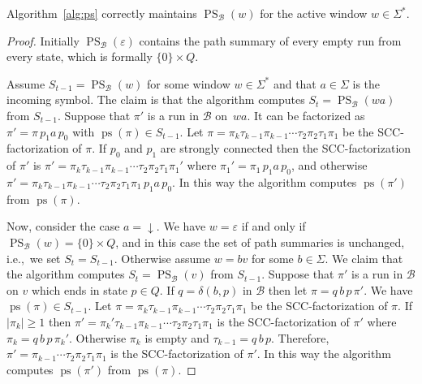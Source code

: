 \documentclass{article}\usepackage[a4paper,margin=20mm]{geometry}
\newcommand{\B}{\mathcal{B}}
\DeclareMathOperator{\ps}{ps}
\DeclareMathOperator{\PS}{PS}
\newcommand{\eps}{\varepsilon}
\renewcommand{\geq}{\geqslant}
\renewcommand{\ge}{\geq}
\begin{document}
\begin{lemma}
\label{lem:ps}
	Algorithm~\ref{alg:ps} correctly maintains $\PS_\B(w)$ for the active window $w \in \Sigma^*$.
\end{lemma}

\begin{proof}
	Initially $\PS_\B(\eps)$ contains the path summary of every empty run from every state,
	which is formally $\{0\} \times Q$.
	
	Assume $S_{t-1} = \PS_\B(w)$ for some window $w \in \Sigma^*$ and that $a \in \Sigma$ is the incoming symbol.
	The claim is that the algorithm computes $S_t = \PS_\B(wa)$ from $S_{t-1}$.
	Suppose that $\pi'$ is a run in $\B$ on~$wa$.
	It can be factorized as $\pi' = \pi \, p_1 a \, p_0$ with $\ps(\pi) \in S_{t-1}$.
	Let $\pi = \pi_k \tau_{k-1}  \pi_{k-1} \cdots \tau_2 \pi_2 \tau_1 \pi_1$ be the SCC-factorization of $\pi$.
	If $p_0$ and $p_1$ are strongly connected then the SCC-factorization
	of $\pi'$ is $\pi' = \pi_k \tau_{k-1}  \pi_{k-1} \cdots \tau_2 \pi_2 \tau_1 \pi_1'$
	where $\pi_1' = \pi_1 \, p_1 a \, p_0$, and otherwise
	$\pi' = \pi_k \tau_{k-1}  \pi_{k-1} \cdots \tau_2 \pi_2 \tau_1 \pi_1 \, p_1 a \, p_0$.
	In this way the algorithm computes $\ps(\pi')$ from $\ps(\pi)$.
	
	Now, consider the case $a = {\downarrow}$.
	We have $w = \eps$ if and only if $\PS_\B(w) = \{0\} \times Q$,
	and in this case the set of path summaries  is unchanged, i.e.,~we set $S_t = S_{t-1}$.
	Otherwise assume $w = bv$ for some $b \in \Sigma$.
	We claim that the algorithm computes $S_t = \PS_\B(v)$ from $S_{t-1}$.
	Suppose that $\pi'$ is a run in $\B$ on $v$ which ends in state $p \in Q$.
	If $q = \delta(b,p)$ in $\B$ then let $\pi = q \, b \, p \, \pi'$. We have $\ps(\pi) \in S_{t-1}$.
	Let $\pi = \pi_k \tau_{k-1}  \pi_{k-1} \cdots \tau_2 \pi_2 \tau_1 \pi_1$ be the SCC-factorization of $\pi$.
	If $|\pi_k| \ge 1$ then $\pi' = \pi_k' \tau_{k-1}  \pi_{k-1} \cdots \tau_2 \pi_2 \tau_1 \pi_1$ 
	is the SCC-factorization of $\pi'$ where $\pi_k = q \, b \, p \, \pi_k'$.
	Otherwise $\pi_k$ is empty and $\tau_{k-1} = q \, b \, p$.
	Therefore, $\pi' = \pi_{k-1} \cdots \tau_2 \pi_2 \tau_1 \pi_1$ is the SCC-factorization of $\pi'$.
	In this way the algorithm computes $\ps(\pi')$ from $\ps(\pi)$.
\end{proof}
\end{document}
